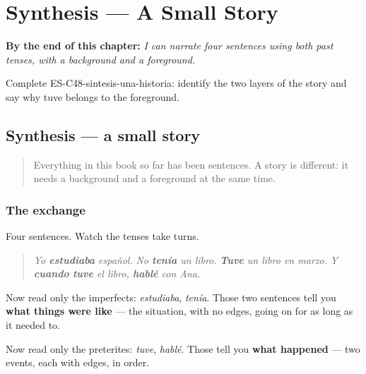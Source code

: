 
\chapter{Synthesis --- A Small Story}
\label{ch:synthesis-story}

\begin{chapteropening}
\textbf{By the end of this chapter:} \emph{I can narrate four sentences using both past tenses, with a background and a foreground.}

Complete ES-C48-sintesis-una-historia: identify the two layers of the story and say why tuve belongs to the foreground.
\end{chapteropening}

\section[Practice]{Synthesis — a small story}

\label{lesson:ES-C48-sintesis-una-historia}



\begin{quote}
Everything in this book so far has been sentences. A story is different: it needs a background and a foreground at the same time.
\end{quote}

\subsection*{The exchange}
Four sentences. Watch the tenses take turns.

\begin{quote}
\emph{Yo \textbf{estudiaba} español.} \emph{No \textbf{tenía} un libro.} \emph{\textbf{Tuve} un libro en marzo.} \emph{Y \textbf{cuando} \textbf{tuve} el libro, \textbf{hablé} con Ana.}
\end{quote}

Now read only the imperfects: \emph{estudiaba}, \emph{tenía}. Those two sentences tell you \textbf{what things were like} — the situation, with no edges, going on for as long as it needed to.

Now read only the preterites: \emph{tuve}, \emph{hablé}. Those tell you \textbf{what happened} — two events, each with edges, in order.

